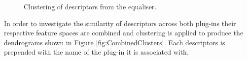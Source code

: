 		\begin{figure}[h!]
			\centering
			\qquad
			\caption{Clustering of descriptors from the equaliser.}
			\label{fig:EqualiserClusters}
		\end{figure}
		
		In order to investigate the similarity of descriptors across both plug-ins their respective feature spaces
		are combined and clustering is applied to produce the dendrograms shown in Figure
		\ref{fig:CombinedClusters}.  Each descriptors is prepended with the name of the plug-in it is associated
		with.

